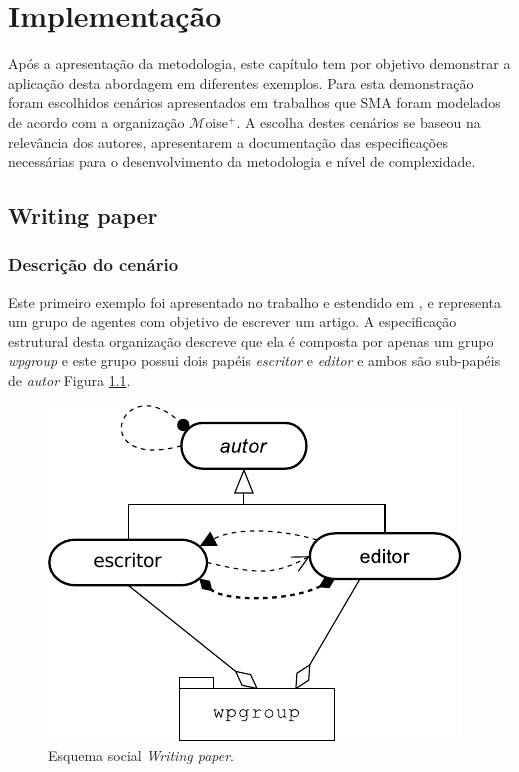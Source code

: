 \chapter{Implementação}

Após a apresentação da metodologia, este capítulo tem por objetivo demonstrar a aplicação desta abordagem em diferentes exemplos. Para esta demonstração foram escolhidos cenários apresentados em trabalhos que SMA foram modelados de acordo com a organização $\mathcal{M}$oise$^{+}$. A escolha destes cenários se baseou na relevância dos autores, apresentarem a documentação das especificações necessárias para o desenvolvimento da metodologia e nível de complexidade.

\section{Writing paper}

\subsection{Descrição do cenário}

Este primeiro exemplo foi apresentado no trabalho \cite{kitio2008organisational} e estendido em \cite{hubner2011normative}, e representa um grupo de agentes com objetivo de escrever um artigo. A especificação estrutural desta organização descreve que ela é composta por apenas um grupo \textit{wpgroup} e este grupo possui dois papéis \textit{escritor} e \textit{editor} e ambos são sub-papéis de \textit{autor} Figura \ref{fig:writing-paper-estrutural}.
    
\begin{figure}[ht]
\centering
\includegraphics[scale=0.7]{imagens/5-writing-paper-estrutural.pdf}
\caption{Esquema social \textit{Writing paper}. \cite{hubner2011normative}}
\label{fig:writing-paper-estrutural}
\end{figure}
    
